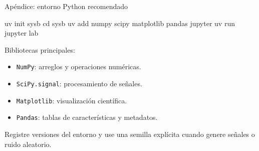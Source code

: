 \documentclass[
  ignorenonframetext,
  aspectratio=169,
  spanish,
  professionalfonts]{beamer}
\newenvironment{Shaded}{\begin{snugshade}}{\end{snugshade}}
\newcommand{\BuiltInTok}[1]{\textcolor[rgb]{0.00,0.23,0.31}{#1}}
\newcommand{\ExtensionTok}[1]{\textcolor[rgb]{0.00,0.23,0.31}{#1}}
\newcommand{\NormalTok}[1]{\textcolor[rgb]{0.00,0.23,0.31}{#1}}
\providecommand{\tightlist}{%
  \setlength{\itemsep}{0pt}\setlength{\parskip}{0pt}}
\begin{document}
\begin{frame}[fragile]{Apéndice: entorno Python recomendado}
\protect{}\label{apuxe9ndice-entorno-python-recomendado}
\begin{Shaded}
\begin{Highlighting}[]
\ExtensionTok{uv}\NormalTok{ init sysb}
\BuiltInTok{cd}\NormalTok{ sysb}
\ExtensionTok{uv}\NormalTok{ add numpy scipy matplotlib pandas jupyter}
\ExtensionTok{uv}\NormalTok{ run jupyter lab}
\end{Highlighting}
\end{Shaded}

Bibliotecas principales:

\begin{itemize}
\tightlist
\item
  \texttt{NumPy}: arreglos y operaciones numéricas.
\item
  \texttt{SciPy.signal}: procesamiento de señales.
\item
  \texttt{Matplotlib}: visualización científica.
\item
  \texttt{Pandas}: tablas de características y metadatos.
\end{itemize}

\begin{tcolorbox}[enhanced jigsaw, arc=.35mm, bottomrule=.15mm, bottomtitle=1mm, breakable, colback=white, colbacktitle=quarto-callout-tip-color!10!white, colframe=quarto-callout-tip-color-frame, coltitle=black, left=2mm, leftrule=.75mm, opacityback=0, opacitybacktitle=0.6, rightrule=.15mm, title={Reproducibilidad}, titlerule=0mm, toprule=.15mm, toptitle=1mm]

Registre versiones del entorno y use una semilla explícita cuando genere
señales o ruido aleatorio.

\end{tcolorbox}
\end{frame}
\end{document}

